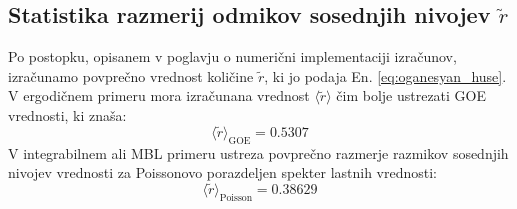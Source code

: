  \subsection{Statistika razmerij odmikov sosednjih nivojev $\tilde{r}$}
 Po postopku, opisanem v poglavju o numerični implementaciji izračunov, izračunamo povprečno vrednost količine $\tilde{r}$, ki jo podaja En. \eqref{eq:oganesyan_huse}. V ergodičnem primeru mora izračunana vrednost $\langle \tilde{r}\rangle$ čim bolje ustrezati GOE vrednosti, ki znaša:
 \begin{equation}\label{eq:r_GOE}
 \langle \tilde{r}\rangle_\mathrm{GOE}=0.5307
 \end{equation}
 V integrabilnem ali MBL primeru ustreza povprečno razmerje razmikov sosednjih nivojev vrednosti za Poissonovo porazdeljen spekter lastnih vrednosti: 
 \begin{equation}\label{eq:r_poisson}
 \langle \tilde{r}\rangle_\mathrm{Poisson}=0.38629
 \end{equation}

